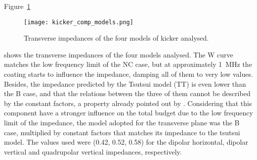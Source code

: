    Figure~\ref{fig:uncoupled_flux_impedance}
    \begin{figure}
        \centering
        \texttt{[image: kicker\_comp\_models.png]}
        \caption{Transverse impedances of the four models of kicker analysed.}
        \label{fig:uncoupled_flux_impedance}
    \end{figure}
    shows the transverse impedances of the four models analysed. The W curve matches the low frequency limit of the NC case, but at approximately \SI{1}{\mega\hertz} the coating starts to influence the impedance, damping all of them to very low values. Besides, the impedance predicted by the Tsutsui model (TT) is even lower than the B case, and that the relations between the three of them cannot be described by the constant  factors, a property already pointed out by . Considering that this component have a stronger influence on the total budget due to the low frequency limit of the impedance, the model adopted for the transverse plane was the B case, multiplied by constant factors that matches its impedance to the tsutsui model. The values used were (0.42, 0.52, 0.58) for the dipolar horizontal, dipolar vertical and quadrupolar vertical impedances, respectively.

